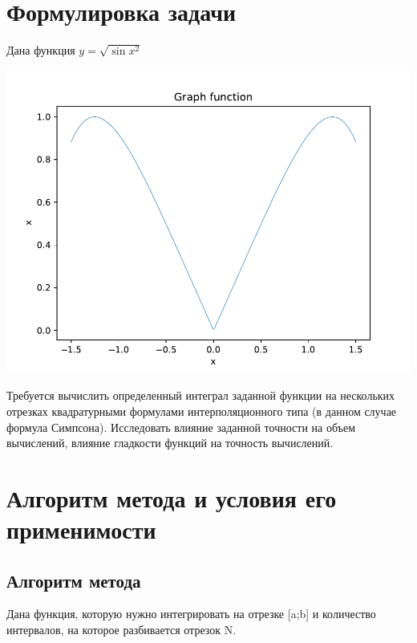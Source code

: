 






\section{Формулировка задачи}

Дана функция 
\begin{math} 
	y=\sqrt{\sin{x^{2}}}
\end{math}

\includegraphics[scale=0.75]{func.pdf}

Требуется вычислить определенный интеграл заданной функции на нескольких отрезках квадратурными формулами интерполяционного типа (в данном случае формула Симпсона). Исследовать влияние заданной точности на объем вычислений, влияние гладкости функций на точность вычислений.

\section{Алгоритм метода и условия его применимости}

\subsection{Алгоритм метода}

Дана функция, которую нужно интегрировать на отрезке [a;b] и количество интервалов, на которое разбивается отрезок N. 

